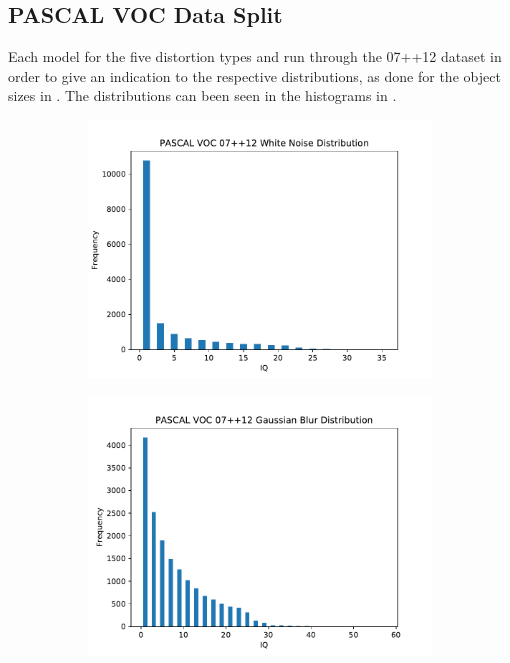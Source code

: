 \subsection{PASCAL VOC Data Split}
Each model for the five distortion types and run through the 07++12 dataset in order to give an indication to the respective distributions, as done for the object sizes in . The distributions can been seen in the histograms in .
\begin{figure}[H]
    \centering
    \begin{subfigure}[b]{0.4\textwidth}
        \center
        \includegraphics[width=\textwidth]{Figs/Implementation/WhiteNoisedist.pdf}
        \caption{}\label{fig:dist_wn}
    \end{subfigure}
    \begin{subfigure}[b]{0.4\textwidth}
        \center
        \includegraphics[width=\textwidth]{Figs/Implementation/GaussianBlurdist.pdf}

\end{subfigure}
\end{figure}
